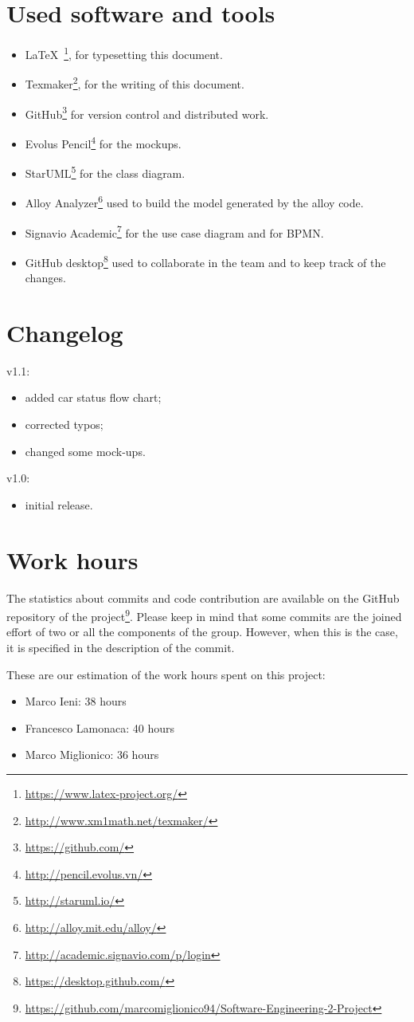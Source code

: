 \section{Used software and tools}
\begin{itemize}
    \item \LaTeX\ \footnote{\url{https://www.latex-project.org/}}, for typesetting this document.
    \item Texmaker\footnote{\url{http://www.xm1math.net/texmaker/}}, for the writing of this document.
    \item GitHub\footnote{\url{https://github.com/}} for version control and distributed work.
    \item Evolus Pencil\footnote{\url{http://pencil.evolus.vn/}} for the mockups.
    \item StarUML\footnote{\url{http://staruml.io/}} for the class diagram.
    \item Alloy Analyzer\footnote{\url{http://alloy.mit.edu/alloy/}} used to build the model generated by the alloy code.
    \item Signavio Academic\footnote{\url{http://academic.signavio.com/p/login}} for the use case diagram and for BPMN.
    \item GitHub desktop\footnote{\url{https://desktop.github.com/}} used to collaborate in the team and to keep track of the changes. 
\end{itemize}

\section{Changelog}

v1.1:
\begin{itemize}
\item added car status flow chart;
\item corrected typos;
\item changed some mock-ups.
\end{itemize}

v1.0:
\begin{itemize}
\item initial release.
\end{itemize}

\section{Work hours}
The statistics about commits and code contribution are available on the GitHub repository of the project\footnote{\url{https://github.com/marcomiglionico94/Software-Engineering-2-Project}}.
Please keep in mind that some commits are the joined effort of two or all the components of the group. However, when this is the case, it is specified in the description of the commit.

These are our estimation of the work hours spent on this project:
\begin{itemize}
    \item Marco Ieni: 38 hours
    \item Francesco Lamonaca: 40 hours
    \item Marco Miglionico: 36 hours
\end{itemize}
